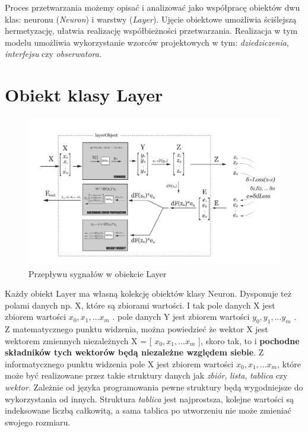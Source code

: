 
Proces przetwarzania możemy opisać i analizować jako współpracę obiektów dwu klas: neuronu (\textit{Neuron}) i warstwy (\textit{Layer}). Ujęcie obiektowe umożliwia ściślejszą hermetyzację, ułatwia realizację współbieżności przetwarzania. Realizacja w tym modelu umożliwia wykorzystanie wzorców projektowych w tym: \textit{dziedziczenia}, \textit{interfejsu} czy \textit{obserwatora}.

\section{ Obiekt klasy Layer }

\begin{figure}[h]
	\centering \includegraphics[width=\textwidth]{gfx/rys1_4.pdf} 
	\caption{ Przepływu sygnałów w obiekcie Layer  }
	\label{rys:modelobiektowegoneuronuszkic1}
\end{figure}

Każdy obiekt Layer ma własną kolekcję obiektów klasy Neuron. Dysponuje też polami danych np. X, które są zbiorami wartości. I tak pole danych X jest zbiorem wartości { \(x_0, x_1, ... x_m \) }. pole danych Y jest zbiorem wartości { \(y_0, y_1, ... y_m \) }. Z matematycznego punktu widzenia, można powiedzieć że wektor X jest wektorem zmiennych niezależnych X = [ \(x_0, x_1, ... x_m \) ], skoro tak, to i \textbf{pochodne składników tych wektorów będą niezależne względem siebie}. Z informatycznego punktu widzenia pole X jest zbiorem wartości  \(x_0, x_1, ... x_m \), które może być realizowane przez takie struktury danych jak \textit{zbiór}, \textit{lista}, \textit{tablica} czy \textit{wektor}. Zależnie od języka programowania pewne struktury będą wygodniejsze do wykorzystania od innych. Struktura \textit{tablica} jest najprostsza, kolejne wartości są indeksowane liczbą całkowitą, a sama tablica po utworzeniu nie może zmieniać swojego rozmiaru. 

